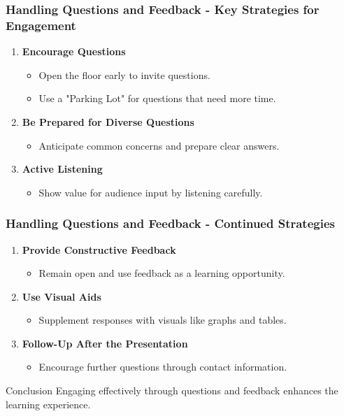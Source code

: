 \documentclass{beamer}
\begin{document}
\begin{frame}[fragile]
    \frametitle{Handling Questions and Feedback - Key Strategies for Engagement}
    \begin{enumerate}
        \item \textbf{Encourage Questions}
        \begin{itemize}
            \item Open the floor early to invite questions.
            \item Use a "Parking Lot" for questions that need more time.
        \end{itemize}
        \item \textbf{Be Prepared for Diverse Questions}
        \begin{itemize}
            \item Anticipate common concerns and prepare clear answers.
        \end{itemize}
        \item \textbf{Active Listening}
        \begin{itemize}
            \item Show value for audience input by listening carefully.
        \end{itemize}
    \end{enumerate}
\end{frame}

\begin{frame}[fragile]
    \frametitle{Handling Questions and Feedback - Continued Strategies}
    \begin{enumerate}[start=4]
        \item \textbf{Provide Constructive Feedback}
        \begin{itemize}
            \item Remain open and use feedback as a learning opportunity.
        \end{itemize}
        \item \textbf{Use Visual Aids}
        \begin{itemize}
            \item Supplement responses with visuals like graphs and tables.
        \end{itemize}
        \item \textbf{Follow-Up After the Presentation}
        \begin{itemize}
            \item Encourage further questions through contact information.
        \end{itemize}
    \end{enumerate}
    
    \begin{block}{Conclusion}
        Engaging effectively through questions and feedback enhances the learning experience.
    \end{block}
\end{frame}
\end{document}
